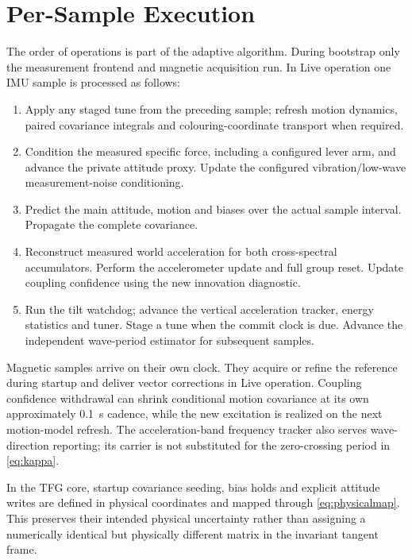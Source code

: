 \documentclass[conference]{IEEEtran}
\begin{document}
\section{Per-Sample Execution}
\label{sec:execution}
The order of operations is part of the adaptive algorithm. During
bootstrap only the measurement frontend and magnetic acquisition run.
In Live operation one IMU sample is processed as follows:
\begin{enumerate}
 \item Apply any staged tune from the preceding sample; refresh motion
 dynamics, paired covariance integrals and colouring-coordinate transport
 when required.
 \item Condition the measured specific force, including a configured
 lever arm, and advance the private attitude proxy. Update the configured
 vibration/low-wave measurement-noise conditioning.
 \item Predict the main attitude, motion and biases over the actual
 sample interval. Propagate the complete covariance.
 \item Reconstruct measured world acceleration for both cross-spectral
 accumulators. Perform the accelerometer update and full group reset.
 Update coupling confidence using the new innovation diagnostic.
 \item Run the tilt watchdog; advance the vertical acceleration tracker,
 energy statistics and tuner. Stage a tune when the commit clock is due.
 Advance the independent wave-period estimator for subsequent samples.
\end{enumerate}
Magnetic samples arrive on their own clock. They acquire or refine the
reference during startup and deliver vector corrections in Live
operation. Coupling confidence withdrawal can shrink conditional motion
covariance at its own approximately 0.1~s cadence, while the new excitation
is realized on the next motion-model refresh. The acceleration-band
frequency tracker also serves wave-direction reporting; its carrier is
not substituted for the zero-crossing period in \cref{eq:kappa}.


In the TFG core, startup covariance seeding, bias holds and explicit attitude
writes are defined in physical coordinates and mapped through
\cref{eq:physicalmap}. This preserves their intended physical uncertainty
rather than assigning a numerically identical but physically different
matrix in the invariant tangent frame.



\end{document}

